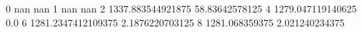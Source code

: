 0 nan nan
1 nan nan
2 1337.883544921875 58.83642578125
4 1279.047119140625 0.0
6 1281.2347412109375 2.1876220703125
8 1281.068359375 2.021240234375
